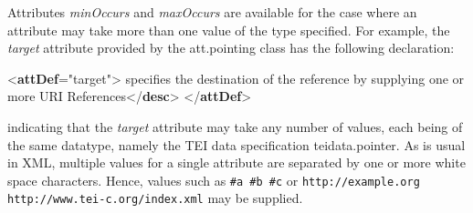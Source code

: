 Attributes {\itshape minOccurs} and {\itshape maxOccurs} are available for the case where an attribute may take more than one value of the type specified. For example, the {\itshape target} attribute provided by the \textsf{att.pointing} class has the following declaration: \par\bgroup{}\exampleFont \begin{shaded}\noindent\mbox{}{<\textbf{attDef}\hspace*{1em}{ident}="{target}">}\mbox{}\newline 
{}specifies the destination of the reference by\mbox{}\newline 
\hspace*{1em}\hspace*{1em} supplying one or more URI References{</\textbf{desc}>}\mbox{}\newline 
{}\mbox{}\newline 
\hspace*{1em}\mbox{}\newline 
{}\mbox{}\newline 
{</\textbf{attDef}>}\end{shaded}\egroup\par \noindent  indicating that the {\itshape target} attribute may take any number of values, each being of the same datatype, namely the TEI data specification \textsf{teidata.pointer}. As is usual in XML, multiple values for a single attribute are separated by one or more white space characters. Hence, values such as \texttt{\#a \#b \#c} or \texttt{http://example.org http://www.tei-c.org/index.xml} may be supplied. 
